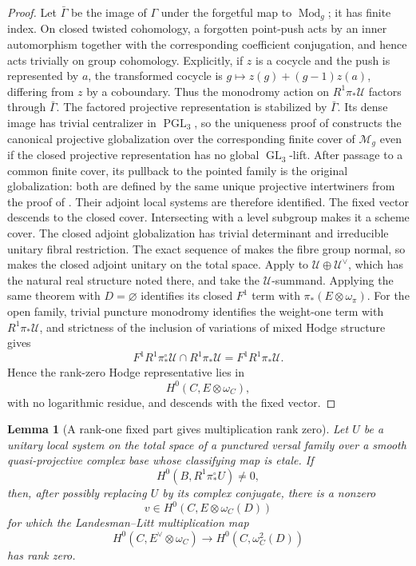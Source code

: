 \documentclass[11pt]{article}
\newtheorem{lemma}[theorem]{Lemma}
\theoremstyle{definition}
\newcommand{\Mcal}{\mathcal M}
\newcommand{\Ucal}{\mathcal U}
\newcommand{\Mod}{\operatorname{Mod}}
\newcommand{\GL}{\operatorname{GL}}
\newcommand{\PGL}{\operatorname{PGL}}
\begin{document}
\begin{proof}
Let $\bar\Gamma$ be the image of $\Gamma$ under the forgetful map to
$\Mod_g$; it has finite index.  On closed twisted cohomology, a forgotten
point-push acts by an inner automorphism together with the corresponding
coefficient conjugation, and hence acts trivially on group cohomology.
Explicitly, if $z$ is a cocycle and the push is represented by $a$, the
transformed cocycle is $g\mapsto z(g)+(g-1)z(a)$, differing from $z$ by a
coboundary.
Thus the monodromy action on $R^1\pi_*\Ucal$ factors through
$\bar\Gamma$.  The factored projective representation is stabilized by
$\bar\Gamma$.  Its dense image has trivial centralizer in $\PGL_3$, so the
uniqueness proof of \cite[Lemma 2.2.2]{LLCan} constructs the canonical
projective globalization over the corresponding finite cover of $\Mcal_g$
even if the closed projective representation has no global $\GL_3$-lift.
After passage to a common finite cover, its pullback to the pointed family is
the original globalization: both are defined by the same unique projective
intertwiners from the proof of \cite[Lemma 2.2.2]{LLCan}.
Their adjoint local systems are therefore identified.  The fixed vector
descends to the closed cover.  Intersecting with a level subgroup makes it a
scheme cover.  The closed adjoint globalization has trivial determinant and
irreducible unitary fibral restriction.  The exact sequence of
\cite[Lemma 2.1.5]{LLCan} makes the fibre group normal, so
\cite[Lemma 2.4.1(2)]{LLCan} makes the closed adjoint unitary on the total
space.  Apply \cite[Theorem 4.1.1]{LLCan} to
$\Ucal\oplus\Ucal^\vee$, which has the natural real structure noted there,
and take the $\Ucal$-summand.  Applying the same theorem with
$D=\varnothing$ identifies its closed $F^1$ term with
$\pi_*(E\otimes\omega_\pi)$.  For the open family, trivial puncture monodromy
identifies the weight-one term with $R^1\pi_*\Ucal$, and strictness of the
inclusion of variations of mixed Hodge structure gives
\[
 F^1R^1\pi_*^\circ\Ucal\cap R^1\pi_*\Ucal
 =F^1R^1\pi_*\Ucal.
\]
Hence the rank-zero Hodge representative lies in
\[
 H^0(C,E\otimes\omega_C),
\]
with no logarithmic residue, and descends with the fixed vector.
\end{proof}

\begin{lemma}[A rank-one fixed part gives multiplication rank zero]
\label{lem:fixedpart-rankzero}
Let $U$ be a unitary local system on the total space of a punctured versal
family over a smooth quasi-projective complex base whose classifying map is
etale.  If
\[
 H^0(B,R^1\pi_*^\circ U)\ne0,
\]
then, after possibly replacing $U$ by its complex conjugate, there is a
nonzero
\[
 v\in H^0(C,E\otimes\omega_C(D))
\]
for which the Landesman--Litt multiplication map
\[
 H^0(C,E^\vee\otimes\omega_C)
 \longrightarrow H^0(C,\omega_C^2(D))
\]
has rank zero.
\end{lemma}
\end{document}
